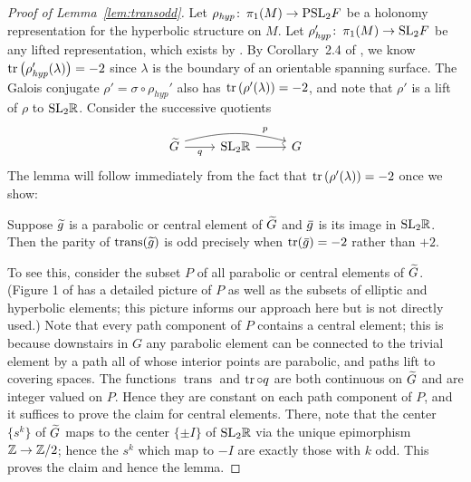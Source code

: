 \documentclass[tikz, sepfignums, defaultenums]{nmd/article}
\DeclareMathOperator{\trans}{trans}
\newcommand{\rhohyp}{\rho_{\mathit{hyp}}}
\begin{document}
\begin{proof}[Proof of Lemma~\ref{lem:transodd}]
Let $\rhohyp \maps \pi_1(M) \to \PSL{2}{F}$ be a holonomy
representation for the hyperbolic structure on $M$. Let
$\rhohyp' \maps \pi_1(M) \to \SL{2}{F}$ be any lifted representation,
which exists by \cite[Proposition 3.1.1]{CullerShalen1983}.
By Corollary~2.4 of \cite{Calegari2006}, we know
$\tr\big(\rhohyp'(\lambda)\big) = -2$ since $\lambda$ is the
boundary of an orientable spanning surface.  The Galois conjugate
$\rho' = \sigma \circ \rhohyp'$ also has
$\operatorname{tr}\left(\rho'(\lambda)\right)= -2$, and note that $\rho'$ is a lift
of $\rho$ to $\mathrm{ SL}_{2} {\mathbb R}$.  Consider the successive quotients
\[
\begin{tikzcd}
\Gtil \arrow{r}[below]{q}
\arrow[bend left=15, start anchor=30, end anchor=150]{rr}[near end]{p}
 & \SL{2}{\R} \arrow{r} & G
\end{tikzcd}
\]
The lemma will follow immediately from the fact that
$\operatorname{tr}\left(\rho'(\lambda)\right) = -2$ once we show:

\begin{claim}
  Suppose $\gtil$ is a parabolic or central element of $\Gtil$ and
  $\gbar$ is its image in $\mathrm{ SL}_{2} {\mathbb R}$.  Then the parity of
  $\trans(\gtil)$ is odd precisely when $\tr(\gbar) = -2$ rather than
  $+2$.
\end{claim}
To see this, consider the subset $P$ of all parabolic or central
elements of $\Gtil$.  (Figure 1 of \cite{Khoi2003} has a detailed
picture of $P$ as well as the subsets of elliptic and hyperbolic
elements; this picture informs our approach here but is not directly 
used.)  Note that every path component of $P$ contains a central
element; this is because downstairs in $G$ any parabolic element can
be connected to the trivial element by a path all of whose interior
points are parabolic, and paths lift to covering spaces.  The
functions $\trans$ and $\operatorname{tr} \circ q$ are both continuous on $\Gtil$
and are integer valued on $P$.  Hence they are constant on each path
component of $P$, and it suffices to prove the claim for central
elements.  There, note that the center $\big\{s^k\big\}$ of $\Gtil$ maps to
the center $\{\pm I\}$ of $\mathrm{ SL}_{2} {\mathbb R}$ via the unique epimorphism
${\mathbb Z} \to {\mathbb Z}/2$; hence the $s^k$ which map to $-I$ are exactly those
with $k$ odd.  This proves the claim and hence the lemma.
\end{proof}
\end{document}
